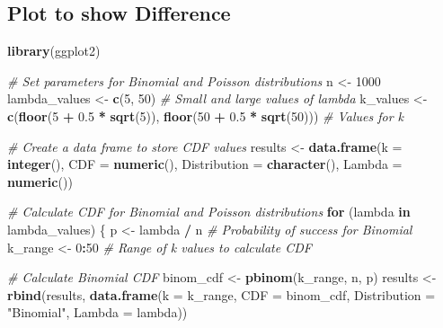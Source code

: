 \documentclass[
]{article}
\newenvironment{Shaded}{\begin{snugshade}}{\end{snugshade}}
\newcommand{\AttributeTok}[1]{\textcolor[rgb]{0.13,0.29,0.53}{#1}}
\newcommand{\CommentTok}[1]{\textcolor[rgb]{0.56,0.35,0.01}{\textit{#1}}}
\newcommand{\ControlFlowTok}[1]{\textcolor[rgb]{0.13,0.29,0.53}{\textbf{#1}}}
\newcommand{\DecValTok}[1]{\textcolor[rgb]{0.00,0.00,0.81}{#1}}
\newcommand{\FloatTok}[1]{\textcolor[rgb]{0.00,0.00,0.81}{#1}}
\newcommand{\FunctionTok}[1]{\textcolor[rgb]{0.13,0.29,0.53}{\textbf{#1}}}
\newcommand{\NormalTok}[1]{#1}
\newcommand{\OtherTok}[1]{\textcolor[rgb]{0.56,0.35,0.01}{#1}}
\newcommand{\SpecialCharTok}[1]{\textcolor[rgb]{0.81,0.36,0.00}{\textbf{#1}}}
\newcommand{\StringTok}[1]{\textcolor[rgb]{0.31,0.60,0.02}{#1}}
\begin{document}
\subsection{Plot to show Difference}\label{plot-to-show-difference}

\begin{Shaded}
\begin{Highlighting}[]
\FunctionTok{library}\NormalTok{(ggplot2)}

\CommentTok{\# Set parameters for Binomial and Poisson distributions}
\NormalTok{n }\OtherTok{\textless{}{-}} \DecValTok{1000}
\NormalTok{lambda\_values }\OtherTok{\textless{}{-}} \FunctionTok{c}\NormalTok{(}\DecValTok{5}\NormalTok{, }\DecValTok{50}\NormalTok{)  }\CommentTok{\# Small and large values of lambda}
\NormalTok{k\_values }\OtherTok{\textless{}{-}} \FunctionTok{c}\NormalTok{(}\FunctionTok{floor}\NormalTok{(}\DecValTok{5} \SpecialCharTok{+} \FloatTok{0.5} \SpecialCharTok{*} \FunctionTok{sqrt}\NormalTok{(}\DecValTok{5}\NormalTok{)), }\FunctionTok{floor}\NormalTok{(}\DecValTok{50} \SpecialCharTok{+} \FloatTok{0.5} \SpecialCharTok{*} \FunctionTok{sqrt}\NormalTok{(}\DecValTok{50}\NormalTok{)))  }\CommentTok{\# Values for k}

\CommentTok{\# Create a data frame to store CDF values}
\NormalTok{results }\OtherTok{\textless{}{-}} \FunctionTok{data.frame}\NormalTok{(}\AttributeTok{k =} \FunctionTok{integer}\NormalTok{(), }\AttributeTok{CDF =} \FunctionTok{numeric}\NormalTok{(), }\AttributeTok{Distribution =} \FunctionTok{character}\NormalTok{(), }\AttributeTok{Lambda =} \FunctionTok{numeric}\NormalTok{())}

\CommentTok{\# Calculate CDF for Binomial and Poisson distributions}
\ControlFlowTok{for}\NormalTok{ (lambda }\ControlFlowTok{in}\NormalTok{ lambda\_values) \{}
\NormalTok{  p }\OtherTok{\textless{}{-}}\NormalTok{ lambda }\SpecialCharTok{/}\NormalTok{ n  }\CommentTok{\# Probability of success for Binomial}
\NormalTok{  k\_range }\OtherTok{\textless{}{-}} \DecValTok{0}\SpecialCharTok{:}\DecValTok{50}  \CommentTok{\# Range of k values to calculate CDF}

  \CommentTok{\# Calculate Binomial CDF}
\NormalTok{  binom\_cdf }\OtherTok{\textless{}{-}} \FunctionTok{pbinom}\NormalTok{(k\_range, n, p)}
\NormalTok{  results }\OtherTok{\textless{}{-}} \FunctionTok{rbind}\NormalTok{(results, }\FunctionTok{data.frame}\NormalTok{(}\AttributeTok{k =}\NormalTok{ k\_range, }\AttributeTok{CDF =}\NormalTok{ binom\_cdf, }\AttributeTok{Distribution =} \StringTok{"Binomial"}\NormalTok{, }\AttributeTok{Lambda =}\NormalTok{ lambda))}
  

\end{Highlighting}
\end{Shaded}
\end{document}
